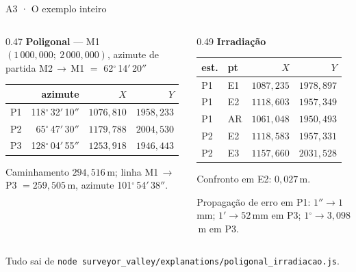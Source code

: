 \documentclass[aspectratio=169,11pt]{beamer}
\newcommand{\gr}[3]{#1\ensuremath{^\circ}\,#2\ensuremath{'}\,#3\ensuremath{''}}
\begin{document}
\begin{frame}{A3 · O exemplo inteiro}
  \scriptsize
  \begin{columns}[T]
    \begin{column}{0.47\textwidth}
      \textbf{Poligonal} --- M1 $(1\,000{,}000;\ 2\,000{,}000)$, azimute de partida
      M2\,$\to$\,M1 $=$ \gr{62}{14}{20}
      \renewcommand{\arraystretch}{1.15}
      \begin{tabular}{@{}lrrr@{}}
        \toprule
        & azimute & $X$ & $Y$ \\
        \midrule
        P1 & \gr{118}{32}{10} & $1076{,}810$ & $1958{,}233$ \\
        P2 & \gr{65}{47}{30} & $1179{,}788$ & $2004{,}530$ \\
        P3 & \gr{128}{04}{55} & $1253{,}918$ & $1946{,}443$ \\
        \bottomrule
      \end{tabular}
      \medskip

      Caminhamento $294{,}516$\,m; linha M1\,$\to$\,P3 $= 259{,}505$\,m,
      azimute \gr{101}{54}{38}.
    \end{column}
    \begin{column}{0.49\textwidth}
      \textbf{Irradiação}
      \renewcommand{\arraystretch}{1.15}
      \begin{tabular}{@{}llrr@{}}
        \toprule
        est. & pt & $X$ & $Y$ \\
        \midrule
        P1 & E1 & $1087{,}235$ & $1978{,}897$ \\
        P1 & E2 & $1118{,}603$ & $1957{,}349$ \\
        P1 & AR & $1061{,}048$ & $1950{,}493$ \\
        P2 & E2 & $1118{,}583$ & $1957{,}331$ \\
        P2 & E3 & $1157{,}660$ & $2031{,}528$ \\
        \bottomrule
      \end{tabular}
      \medskip

      Confronto em E2: $0{,}027$\,m.
      \smallskip

      Propagação de erro em P1: $1'' \to 1$\,mm; $1' \to 52$\,mm em P3;
      $1\ensuremath{^\circ} \to 3{,}098$\,m em P3.
    \end{column}
  \end{columns}
  \medskip
  \centering
  \normalsize
  Tudo sai de \texttt{node surveyor\_valley/explanations/poligonal\_irradiacao.js}.
\end{frame}
\end{document}

